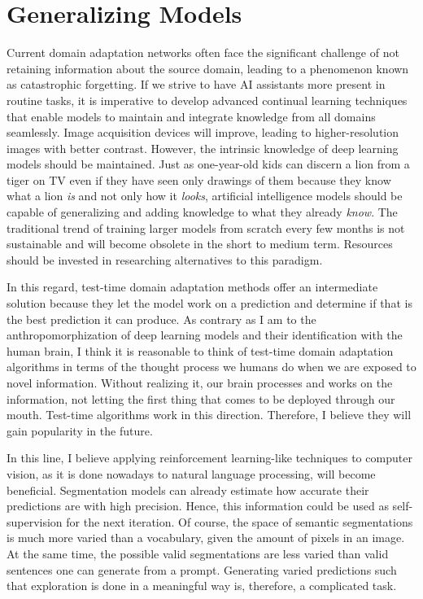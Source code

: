 
\section{Generalizing Models}
Current domain adaptation networks often face the significant challenge of not retaining information about the source domain, leading to a phenomenon known as catastrophic forgetting. If we strive to have AI assistants more present in routine tasks, it is imperative to develop advanced continual learning techniques that enable models to maintain and integrate knowledge from all domains seamlessly. Image acquisition devices will improve, leading to higher-resolution images with better contrast. However, the intrinsic knowledge of deep learning models should be maintained. Just as one-year-old kids can discern a lion from a tiger on TV even if they have seen only drawings of them because they know what a lion \textit{is} and not only how it \textit{looks}, artificial intelligence models should be capable of generalizing and adding knowledge to what they already \textit{know}. The traditional trend of training larger models from scratch every few months is not sustainable and will become obsolete in the short to medium term. Resources should be invested in researching alternatives to this paradigm.

In this regard, test-time domain adaptation methods offer an intermediate solution because they let the model work on a prediction and determine if that is the best prediction it can produce. As contrary as I am to the anthropomorphization of deep learning models and their identification with the human brain, I think it is reasonable to think of test-time domain adaptation algorithms in terms of the thought process we humans do when we are exposed to novel information. Without realizing it, our brain processes and works on the information, not letting the first thing that comes to be deployed through our mouth. Test-time algorithms work in this direction. Therefore, I believe they will gain popularity in the future.

In this line, I believe applying reinforcement learning-like techniques to computer vision, as it is done nowadays to natural language processing, will become beneficial. Segmentation models can already estimate how accurate their predictions are with high precision. Hence, this information could be used as self-supervision for the next iteration. Of course, the space of semantic segmentations is much more varied than a vocabulary, given the amount of pixels in an image. At the same time, the possible valid segmentations are less varied than valid sentences one can generate from a prompt. Generating varied predictions such that exploration is done in a meaningful way is, therefore, a complicated task. 